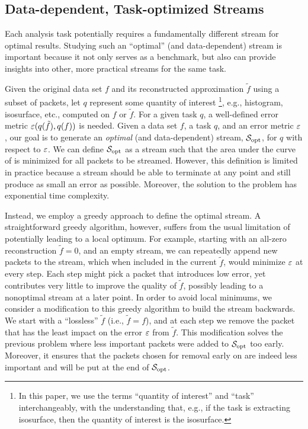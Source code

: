 \subsection{Data-dependent, Task-optimized Streams} \label{sec:data_dep_streams}

Each analysis task potentially requires a fundamentally different stream for optimal results.
Studying such an ``optimal'' (and data-dependent) stream is important because it not only serves as
a benchmark, but also can provide insights into other, more practical streams for the same task.

Given the original data set $f$ and its reconstructed approximation $\tilde{f}$ using a subset of
packets, let $q$ represent some quantity of interest \footnote{In this paper, we use the terms
``quantity of interest'' and ``task'' interchangeably, with the understanding that, e.g., if the
task is extracting isosurface, then the quantity of interest is the isosurface.}, e.g., histogram,
isosurface, etc., computed on $f$ or $\tilde{f}$. For a given task $q$, a well-defined error metric
$\err(q(\tilde{f}),q(f))$ is needed. Given a data set $f$, a task $q$, and an error metric $\err$,
our goal is to generate an \emph{optimal} (and data-dependent) stream, $\sopt$, for $q$ with respect
to $\err$. We can define $\sopt$ as a stream such that the area under the curve of \err is minimized
for all packets to be streamed. However, this definition is limited in practice because a stream
should be able to terminate at any point and still produce as small an error as possible. Moreover,
the solution to the problem has exponential time complexity.

Instead, we employ a greedy approach to define the optimal stream.  A straightforward greedy
algorithm, however, suffers from the usual limitation of potentially leading to a local optimum. For
example, starting with an all-zero reconstruction $\tilde{f}=0$, and an empty stream, we can
repeatedly append new packets to the stream, which when included in the current $\tilde{f}$, would
minimize $\err$ at every step. Each step might pick a packet that introduces low error, yet
contributes very little to improve the quality of $\tilde{f}$, possibly leading to a nonoptimal
stream at a later point. In order to avoid local minimums, we consider a modification to this greedy
algorithm to build the stream backwards. We start with a ``lossless'' $\tilde{f}$ (i.e.,
$\tilde{f}=f$), and at each step we remove the packet that has the least impact on the error $\err$
from $\tilde{f}$. This modification solves the previous problem where less important packets were
added to $\sopt$ too early. Moreover, it ensures that the packets chosen for removal early on are
indeed less important and will be put at the end of $\sopt$.

